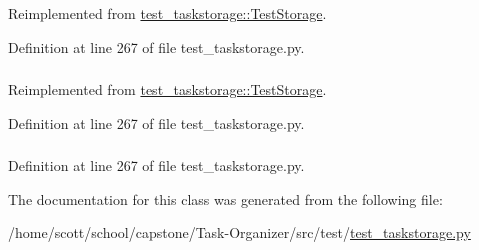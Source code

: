 \-Reimplemented from \hyperlink{classtest__taskstorage_1_1TestStorage_a7d47cd41a51cd29b6f793d373599bd82}{test\-\_\-taskstorage\-::\-Test\-Storage}.



\-Definition at line 267 of file test\-\_\-taskstorage.\-py.

\hypertarget{classtest__taskstorage_1_1TestSQLiteStorage_ae03503042105ca995288e3128553870b}{
\subsubsection[{task\-\_\-storage}]{}}
\label{classtest__taskstorage_1_1TestSQLiteStorage_ae03503042105ca995288e3128553870b}


\-Reimplemented from \hyperlink{classtest__taskstorage_1_1TestStorage_a414fec77c1f9ac66b58f26df514fc048}{test\-\_\-taskstorage\-::\-Test\-Storage}.



\-Definition at line 267 of file test\-\_\-taskstorage.\-py.

\hypertarget{classtest__taskstorage_1_1TestSQLiteStorage_a0ebc44e061d815f63dcd5ef7edbc6cde}{
\subsubsection[{test\-\_\-task\-\_\-dbname}]{}}
\label{classtest__taskstorage_1_1TestSQLiteStorage_a0ebc44e061d815f63dcd5ef7edbc6cde}


\-Definition at line 267 of file test\-\_\-taskstorage.\-py.



\-The documentation for this class was generated from the following file\-:\begin{DoxyCompactItemize}
\item 
/home/scott/school/capstone/\-Task-\/\-Organizer/src/test/\hyperlink{test__taskstorage_8py}{test\-\_\-taskstorage.\-py}\end{DoxyCompactItemize}
